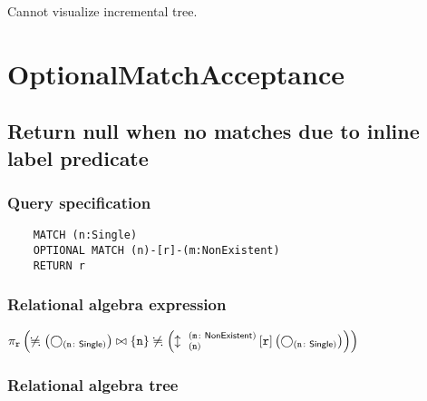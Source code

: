	Cannot visualize incremental tree.

	\section{OptionalMatchAcceptance}

	\subsection{Return null when no matches due to inline label predicate}

	\subsubsection*{Query specification}

	\begin{lstlisting}
	MATCH (n:Single)
	OPTIONAL MATCH (n)-[r]-(m:NonExistent)
	RETURN r
	\end{lstlisting}


	\subsubsection*{Relational algebra expression}

	$\projection{\var{r}} \left(\alldifferent{} \left(\getvertices{n}{Single}\right) \join \{\var{n}\} \alldifferent{} \left(\expandboth{n}{m}{NonExistent}{r}{} \left(\getvertices{n}{Single}\right)\right)\right)$

	\subsubsection*{Relational algebra tree}


